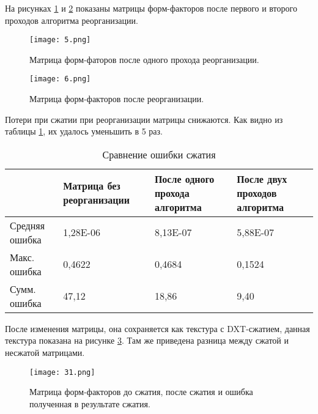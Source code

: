 \documentclass[12pt,fleqn]{article}
\begin{document}
На рисунках \ref{reorder_1} и \ref{reorder_2} показаны матрицы форм-факторов после первого и второго проходов алгоритма реорганизации.

\begin{figure}[htb]
    \centering
    \texttt{[image: 5.png]}
    \caption{Матрица форм-фаторов после одного прохода реорганизации.}
    \label{reorder_1}
\end{figure}

\pagebreak

\begin{figure}[htb]
    \centering
    \texttt{[image: 6.png]}
    \caption{Матрица форм-факторов после реорганизации.}
    \label{reorder_2}
\end{figure}

\pagebreak

Потери при сжатии при реорганизации матрицы снижаются. Как видно из таблицы \ref{table::group}, их удалось уменьшить в 5 раз.

\begin{table}[]
\begin{center}
\begin{tabular}{|p{}|p{}|p{}|p{}|}

\hline
~ & Матрица без реорганизации & После одного прохода алгоритма & После двух проходов алгоритма \\ \hline
Средняя ошибка & 1,28E-06 & 8,13E-07 & 5,88E-07 \\ \hline
Макс. ошибка & 0,4622 & 0,4684 & 0,1524 \\ \hline
Сумм. ошибка & 47,12 & 18,86 & 9,40 \\ \hline

\end{tabular}
\caption{Сравнение ошибки сжатия \label{table::group}}
\end{center}
\end{table}

После изменения матрицы, она сохраняется как текстура с DXT-сжатием, данная текстура показана на рисунке \ref{ff_texture}. Там же приведена разница между сжатой и несжатой матрицами.

\begin{figure}[htb]
    \centering
    \texttt{[image: 31.png]}
    \caption{Матрица форм-факторов до сжатия, после сжатия и ошибка полученная в результате сжатия.}
    \label{ff_texture}
\end{figure}

\pagebreak
\end{document}
